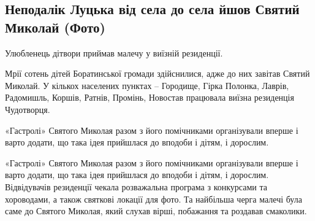 
 
 
 
 
\subsection{Неподалік Луцька від села до села йшов Святий Миколай (Фото)}
\label{sec:29_12_2021.stz.news.ua.volyn.1.luck_sv_mykolaj}


Улюбленець дітвори приймав малечу у виїзній резиденції. 


Мрії сотень дітей Боратинської громади здійснилися, адже до них завітав Святий
Миколай. У кількох населених пунктах – Городище, Гірка Полонка, Лаврів,
Радомишль, Коршів, Ратнів, Промінь, Новостав працювала виїзна резиденція
Чудотворця.

\begin{zznagolos}
«Гастролі» Святого Миколая разом з його помічниками організували вперше і
варто додати, що така ідея прийшлася до вподоби і дітям, і дорослим.
\end{zznagolos}


«Гастролі» Святого Миколая разом з його помічниками організували вперше і варто
додати, що така ідея прийшлася до вподоби і дітям, і дорослим. Відвідувачів
резиденції чекала розважальна програма з конкурсами та хороводами, а також
святкові локації для фото. Та найбільша черга малечі була саме до Святого
Миколая, який слухав вірші, побажання та роздавав смаколики.


